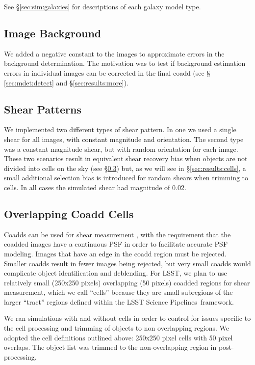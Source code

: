 \documentclass[twocolumn,twocolappendix,astrosym]{openjournal}
\newcommand{\dm}{LSST Science Pipelines}
\newcommand{\mshear}{0.02}
\begin{document}
See \S \ref{sec:sim:galaxies} for descriptions of each galaxy model type.

\subsection{Image Background} \label{sec:sim:bgerr}

We added a negative constant to the images to approximate errors in the
background determination.  The motivation was to test if background estimation
errors in individual images can be corrected in the final coadd (see \S
\ref{sec:mdet:detect} and \S \ref{sec:results:more}).

\subsection{Shear Patterns} \label{sec:sim:shears}

We implemented two different types of shear pattern.  In one we used a single
shear for all images, with constant magnitude and orientation.  The second type
was a constant magnitude shear, but with random orientation for each image.
These two scenarios result in equivalent shear recovery bias when objects are
not divided into cells on the sky (see \S \ref{sec:sim:cells}) but, as we will
see in \S \ref{sec:results:cells}, a small additional selection bias is
introduced for random shears when trimming to cells.  In all cases
the simulated shear had magnitude of \mshear.

\subsection{Overlapping Coadd Cells} \label{sec:sim:cells}

Coadds can be used for shear measurement \citep{ArmstrongCoadd}, with the
requirement that the coadded images have a continuous PSF in order to
facilitate accurate PSF modeling.  Images that have an edge in the coadd region
must be rejected.  Smaller coadds result in fewer images being rejected, but
very small coadds would complicate object identification and deblending.  For
LSST, we plan to use relatively small (250x250 pixels) overlapping (50 pixels)
coadded regions for shear measurement, which we call ``cells'' because they are
small subregions of the larger ``tract'' regions defined within the \dm\
framework.

We ran simulations with and without cells in order to control for issues
specific to the cell processing and trimming of objects to non overlapping
regions.  We adopted the cell definitions outlined above: 250x250 pixel cells
with 50 pixel overlaps. The object list was trimmed to the non-overlapping
region in post-processing.
\end{document}
